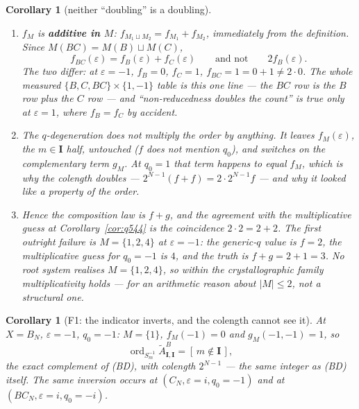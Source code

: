 \documentclass[11pt]{article}
\newtheorem{cor}[thm]{Corollary}
\theoremstyle{definition}
\theoremstyle{remark}
\DeclareMathOperator{\ord}{ord}
\newcommand{\At}{\widetilde{A}}
\newcommand{\bI}{\mathbf{I}}
\begin{document}
\begin{cor}[neither ``doubling'' is a doubling]\label{cor:nodouble}
\begin{enumerate}[label=\textup{(\alph*)},leftmargin=2.2em]
\item $f_M$ is \textbf{additive in $M$}: $f_{M_1\sqcup M_2}=f_{M_1}+f_{M_2}$, immediately
  from the definition.  Since $M(BC)=M(B)\sqcup M(C)$,
  \[
    f_{BC}(\varepsilon)=f_B(\varepsilon)+f_C(\varepsilon)\qquad\text{and not}\qquad
    2f_B(\varepsilon).
  \]
  The two differ: at $\varepsilon=-1$, $f_B=0$, $f_C=1$, $f_{BC}=1=0+1\ne2\cdot0$.  The
  whole measured $\{B,C,BC\}\times\{1,-1\}$ table is this one line --- the $BC$ row is the
  $B$ row plus the $C$ row --- and ``non-reducedness doubles the count'' is true only at
  $\varepsilon=1$, where $f_B=f_C$ by accident.
\item The $q$-degeneration does not multiply the order by anything.  It leaves
  $f_M(\varepsilon)$, the $m\in\bI$ half, \emph{untouched} ($f$ does not mention $q_0$),
  and switches on the complementary term $g_M$.  At $q_0=1$ that term happens to equal
  $f_M$, which is why the \emph{colength} doubles --- $2^{N-1}(f+f)=2\cdot2^{N-1}f$ --- and
  why it looked like a property of the order.
\item Hence the composition law is $f+g$, and the agreement with the multiplicative guess
  at Corollary~\ref{cor:q544} is the coincidence $2\cdot2=2+2$.  The first outright failure
  is $M=\{1,2,4\}$ at $\varepsilon=-1$: the generic-$q$ value is $f=2$, the multiplicative
  guess for $q_0=-1$ is $4$, and the truth is $f+g=2+1=3$.  No root system realises
  $M=\{1,2,4\}$, so within the crystallographic family multiplicativity holds --- for an
  arithmetic reason about $|M|\le2$, not a structural one.
\end{enumerate}
\end{cor}

\begin{cor}[F1: the indicator inverts, and the colength cannot see it]\label{cor:inv}
At $X=B_N$, $\varepsilon=-1$, $q_0=-1$: $M=\{1\}$, $f_M(-1)=0$ and $g_M(-1,-1)=1$, so
\[
  \ord_{S^{-1}_m}\At^{B}_{\bI,\bI}=[\,m\notin\bI\,],
\]
the exact \emph{complement} of \textup{(BD)}, with colength $2^{N-1}$ --- the \emph{same
integer} as (BD) itself.  The same inversion occurs at $(C_N,\varepsilon=i,q_0=-1)$ and at
$(BC_N,\varepsilon=i,q_0=-i)$.
\end{cor}
\end{document}
